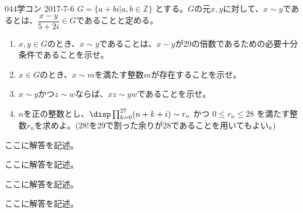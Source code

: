 \begin{prob}{044}{}{学コン 2017-7-6}
 $G=\{a+bi | a, b \in\mathbb{Z}\}$ とする。$G$の元$x,y$に対して、$x\sim y$であるとは、$\dfrac{x-y}{5+2i}\in G$であることと定める。
 \begin{enumerate}
  \item $x, y\in G$のとき、$x\sim y$であることは、$x-y$が29の倍数であるための必要十分条件であることを示せ。
  \item $x\in G$のとき、$x\sim m$を満たす整数$m$が存在することを示せ。
  \item $x\sim y$かつ$z\sim w$ならば、$xz\sim yw$であることを示せ。
  \item $n$を正の整数とし、$\disp \prod_{k=0}^{27} (n+k+i) \sim r_n$ かつ $0\le r_n \le 28$ を満たす整数$r_n$を求めよ。($28!$を29で割った余りが28であることを用いてもよい。)
 \end{enumerate}
\end{prob}

ここに解答を記述。

ここに解答を記述。

ここに解答を記述。

ここに解答を記述。
